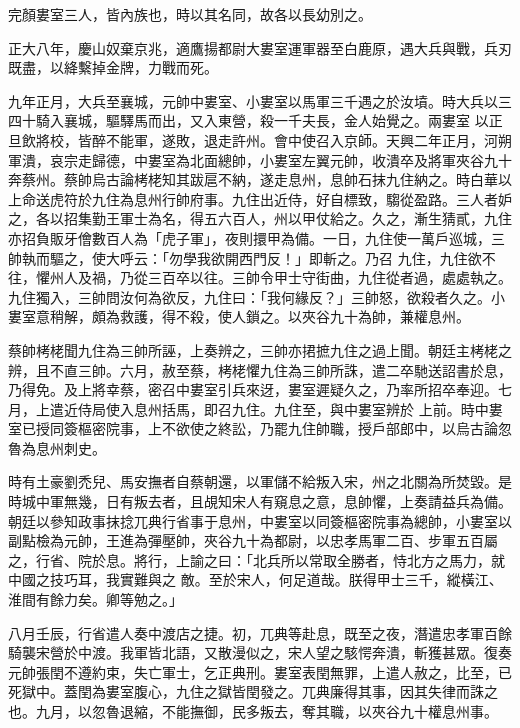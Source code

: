 \begin{pinyinscope}
 完顏婁室三人，皆內族也，時以其名同，故各以長幼別之。



 正大八年，慶山奴棄京兆，適鷹揚都尉大婁室運軍器至白鹿原，遇大兵與戰，兵刃既盡，以絳繫掉金牌，力戰而死。



 九年正月，大兵至襄城，元帥中婁室、小婁室以馬軍三千遇之於汝墳。時大兵以三四十騎入襄城，驅驛馬而出，又入東營，殺一千夫長，金人始覺之。兩婁室
 以正旦飲將校，皆醉不能軍，遂敗，退走許州。會中使召入京師。天興二年正月，河朔軍潰，哀宗走歸德，中婁室為北面總帥，小婁室左翼元帥，收潰卒及將軍夾谷九十奔蔡州。蔡帥烏古論栲栳知其跋扈不納，遂走息州，息帥石抹九住納之。時白華以上命送虎符於九住為息州行帥府事。九住出近侍，好自標致，騶從盈路。三人者妒之，各以招集勤王軍士為名，得五六百人，州以甲仗給之。久之，漸生猜貳，九住亦招負販牙儈數百人為「虎子軍」，夜則擐甲為備。一日，九住使一萬戶巡城，三帥執而驅之，使大呼云：「勿學我欲開西門反！」即斬之。乃召
 九住，九住欲不往，懼州人及禍，乃從三百卒以往。三帥令甲士守街曲，九住從者過，處處執之。九住獨入，三帥問汝何為欲反，九住曰：「我何緣反？」三帥怒，欲殺者久之。小婁室意稍解，頗為救護，得不殺，使人鎖之。以夾谷九十為帥，兼權息州。



 蔡帥栲栳聞九住為三帥所誣，上奏辨之，三帥亦捃摭九住之過上聞。朝廷主栲栳之辨，且不直三帥。六月，赦至蔡，栲栳懼九住為三帥所誅，遣二卒馳送詔書於息，乃得免。及上將幸蔡，密召中婁室引兵來迓，婁室遲疑久之，乃率所招卒奉迎。七月，上遣近侍局使入息州括馬，即召九住。九住至，與中婁室辨於
 上前。時中婁室已授同簽樞密院事，上不欲使之終訟，乃罷九住帥職，授戶部郎中，以烏古論忽魯為息州刺史。



 時有土豪劉禿兒、馬安撫者自蔡朝還，以軍儲不給叛入宋，州之北關為所焚毀。是時城中軍無幾，日有叛去者，且覘知宋人有窺息之意，息帥懼，上奏請益兵為備。朝廷以參知政事抹捻兀典行省事于息州，中婁室以同簽樞密院事為總帥，小婁室以副點檢為元帥，王進為彈壓帥，夾谷九十為都尉，以忠孝馬軍二百、步軍五百屬之，行省、院於息。將行，上諭之曰：「北兵所以常取全勝者，恃北方之馬力，就中國之技巧耳，我實難與之
 敵。至於宋人，何足道哉。朕得甲士三千，縱橫江、淮間有餘力矣。卿等勉之。」



 八月壬辰，行省遣人奏中渡店之捷。初，兀典等赴息，既至之夜，潛遣忠孝軍百餘騎襲宋營於中渡。我軍皆北語，又散漫似之，宋人望之駭愕奔潰，斬獲甚眾。復奏元帥張閏不遵約束，失亡軍士，乞正典刑。婁室表閏無罪，上遣人赦之，比至，已死獄中。蓋閏為婁室腹心，九住之獄皆閏發之。兀典廉得其事，因其失律而誅之也。九月，以忽魯退縮，不能撫御，民多叛去，奪其職，以夾谷九十權息州事。




\end{pinyinscope}
